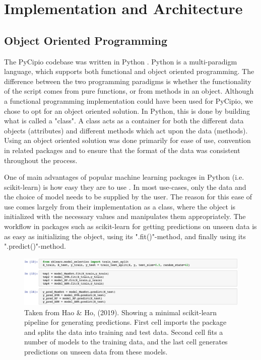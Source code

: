 \documentclass{article}
\begin{document}
\section{Implementation and Architecture}

\subsection{Object Oriented Programming}

The PyCipio codebase was written in Python \cite{Python_main}. Python is a multi-paradigm language, which supports both functional and object oriented programming. The difference between the two programming paradigms is whether the functionality of the script comes from pure functions, or from methods in an object. Although a functional programming implementation could have been used for PyCipio, we chose to opt for an object oriented solution. In Python, this is done by building what is called a "class". A class acts as a container for both the different data objects (attributes) and different methods which act upon the data (methods). Using an object oriented solution was done primarily for ease of use, convention in related packages and to ensure that the format of the data was consistent throughout the process.

One of main advantages of popular machine learning packages in Python (i.e. scikit-learn) is how easy they are to use \cite{Hao_ho}. In most use-cases, only the data and the choice of model needs to be supplied by the user. The reason for this ease of use comes largely from their implementation as a class, where the object is initialized with the necessary values and manipulates them appropriately. The workflow in packages such as scikit-learn for getting predictions on unseen data is as easy as initializing the object, using its ".fit()"-method, and finally using its ".predict()"-method. 

\begin{figure}[H]
    \centerline{\includegraphics{images/sklearn.jpeg}}
    \caption{Taken from Hao \& Ho, (2019). Showing a minimal scikit-learn pipeline for generating predictions. First cell imports the package and splits the data into training and test data. Second cell fits a number of models to the training data, and the last cell generates predictions on unseen data from these models. }
\end{figure}
\end{document}
